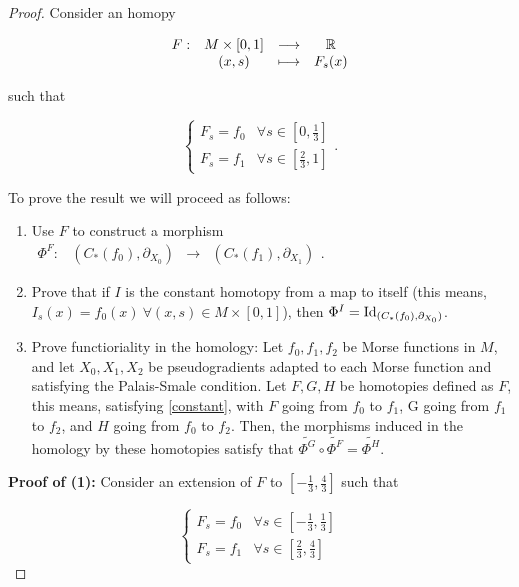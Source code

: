 \begin{proof}
Consider an homopy

\begin{displaymath}
\begin{array}{rccc} F : & M \times [0,1] & \longrightarrow & \mathbb{R} \\ & (x,s) & \longmapsto & F_s(x) \end{array}
\end{displaymath}

such that

\begin{equation} \label{constant}
\left\{ \begin{array}{lc} F_s = f_0 & \forall s \in \left[ 0, \frac13 \right] \\ F_s = f_1 & \forall s \in \left[ \frac23, 1 \right] \end{array} \right. .
\end{equation}

To prove the result we will proceed as follows:

\begin{enumerate}
	\item Use $F$ to construct a morphism $\begin{array}{rccc} \Phi^F : & (C_{\ast}(f_0),\partial_{X_0}) & \rightarrow & (C_{\ast}(f_1),\partial_{X_1}) \end{array}$.
	\item Prove that if $I$ is the constant homotopy from a map to itself (this means, $I_s(x) = f_0(x) \ \forall (x,s) \in M \times [0,1]$), then $\Phi^I = \text{Id}_{(C_{\ast}(f_0),\partial_{X_0})}$.
	\item Prove functioriality in the homology: Let $f_0,f_1,f_2$ be Morse functions in $M$, and let $X_0,X_1,X_2$ be pseudogradients adapted to each Morse function and satisfying the Palais-Smale condition. Let $F, G, H$ be homotopies defined as $F$, this means, satisfying \ref{constant}, with $F$ going from $f_0$ to $f_1$, G going from $f_1$ to $f_2$, and $H$ going from $f_0$ to $f_2$. Then, the morphisms induced in the homology by these homotopies satisfy that $\widetilde{\Phi^G} \circ \widetilde{\Phi^F} = \widetilde{\Phi^H}$.
\end{enumerate}

{\bf Proof of (1):} Consider an extension of $F$ to $\left[ - \frac13 , \frac43 \right]$ such that

\begin{equation} \label{constant2}
\left\{ \begin{array}{lc} F_s = f_0 & \forall s \in \left[ - \frac13, \frac13 \right] \\ F_s = f_1 & \forall s \in \left[ \frac23, \frac43 \right] \end{array} \right.
\end{equation}


\end{proof}
